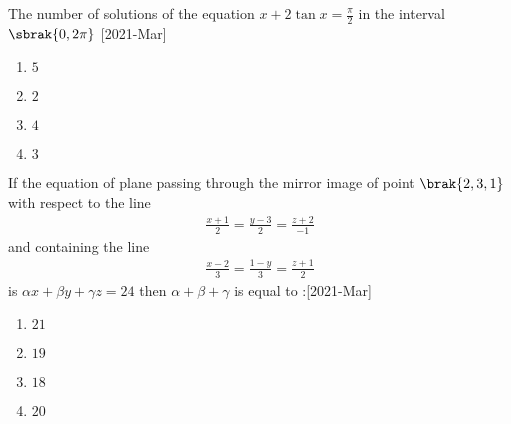     \item The number of solutions of the equation $x + 2\tan{x} = \frac{\pi}{2}$ in the interval $\sbrak{0 , 2\pi}$ \hfill[2021-Mar]
    \begin{multicols}{2}
        \begin{enumerate}
            \item $5$
            \item $2$\\
            \item $4$
            \item $3$
        \end{enumerate}
    \end{multicols}

    \item If the equation of plane passing through the mirror image of point $\brak{2 , 3  , 1}$ with respect to the line 
    \begin{align}
        \frac{x+1}{2} = \frac{y-3}{2} = \frac{z+2}{-1}
    \end{align}
    and containing the line
    \begin{align}\frac{x-2}{3} = \frac{1-y}{3} = \frac{z+1}{2} \end{align}is $\alpha{x}+\beta{y}+\gamma{z} = 24$ then $\alpha + \beta + \gamma$ is equal to :\hfill[2021-Mar] 
    \begin{multicols}{2}
        \begin{enumerate}
            \item $21$
            \item $19$\\
            \item $18$
            \item $20$
        \end{enumerate}
    \end{multicols}

